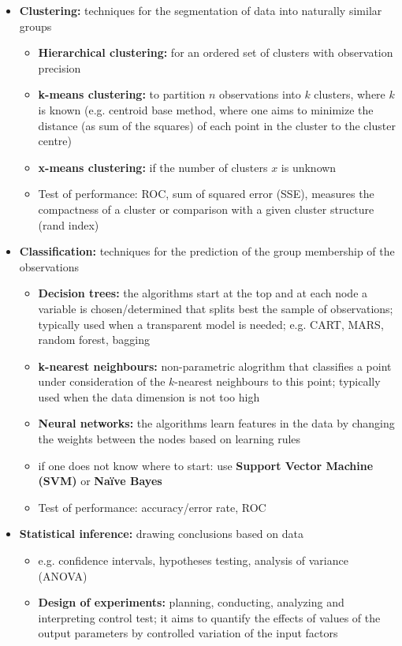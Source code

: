 \documentclass[a4paper, landscape, 6pt, fleqn]{scrartcl}
\renewcommand{\emph}[1]{\textbf{#1}}
\begin{document}
\begin{multicols*}{4}
\begin{itemize}
\begin{itemize}
\end{itemize}
\item \emph{Clustering:} techniques for the segmentation of data into naturally similar groups
\begin{itemize}
\item \emph{Hierarchical clustering:} for an ordered set of clusters with observation precision
\item \emph{k-means clustering:} to partition $n$ observations into $k$ clusters, where $k$ is known (e.g. centroid base method, where one aims to minimize the distance (as sum of the squares) of each point in the cluster to the cluster centre)
\item \emph{x-means clustering:} if the number of clusters $x$ is unknown
\item Test of performance: ROC, sum of squared error (SSE), measures the compactness of a cluster or comparison with a given cluster structure (rand index)
\end{itemize}
\item \emph{Classification:} techniques for the prediction of the group membership of the observations
\begin{itemize}
\item \emph{Decision trees:} the algorithms start at the top and at each node a variable is chosen/determined that splits best the sample of observations; typically used when a transparent model is needed; e.g. CART, MARS, random forest, bagging
\item \emph{k-nearest neighbours:} non-parametric alogrithm that classifies a point under consideration of the $k$-nearest neighbours to this point; typically used when the data dimension is not too high
\item \emph{Neural networks:} the algorithms learn features in the data by changing the weights between the nodes based on learning rules
\item if one does not know where to start: use \emph{Support Vector Machine (SVM)} or \emph{Naïve Bayes}
\item Test of performance: accuracy/error rate, ROC
\end{itemize}
\item \emph{Statistical inference:} drawing conclusions based on data
\begin{itemize}
\item e.g. confidence intervals, hypotheses testing, analysis of variance (ANOVA)
\item \emph{Design of experiments:} planning, conducting, analyzing and interpreting control test; it aims to quantify the effects of values of the output parameters by controlled variation of the input factors

\end{itemize}
\end{itemize}
\end{multicols*}
\end{document}
